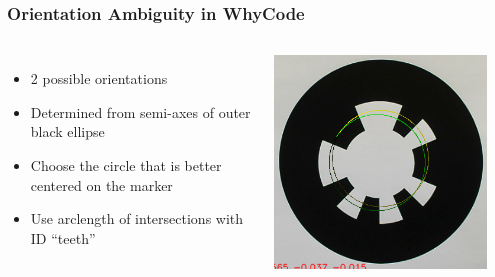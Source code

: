 \documentclass[aspectratio=169]{rubeamer}
\begin{document}
\begin{frame}
  \frametitle{Orientation Ambiguity in WhyCode}
  \begin{columns}
    \begin{itemize}
      \item 2 possible orientations
      \item Determined from semi-axes of outer black ellipse
      \item Choose the circle that is better centered on the marker
      \item Use arclength of intersections with ID ``teeth''
    \end{itemize}
    \centering
    \includegraphics[width=0.9\textwidth]{whycode_orig_both_solutions_cropped}
  \end{columns}
\end{frame}
\end{document}
